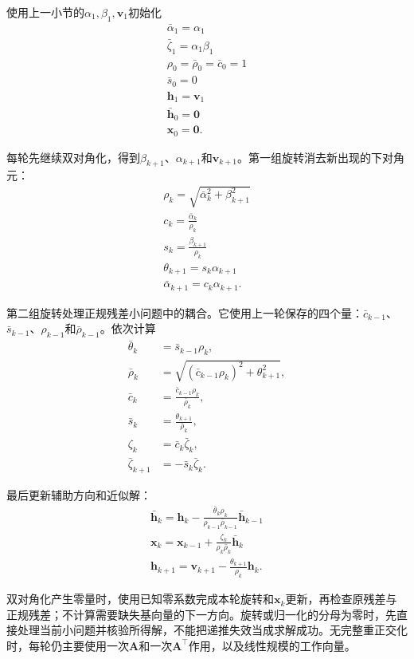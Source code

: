使用上一小节的$\alpha_1,\beta_1,\bm v_1$初始化
\[
 \begin{gathered}
\bar\alpha_1=\alpha_1\\
\bar\zeta_1=\alpha_1\beta_1\\
\rho_0=\bar\rho_0=\bar c_0=1\\
\bar s_0=0\\
\bm h_1=\bm v_1\\
\bar{\bm h}_0=\bm0\\
\bm x_0=\bm0.
 \end{gathered}
\]

每轮先继续双对角化，得到$\beta_{k+1}$、$\alpha_{k+1}$和$\bm v_{k+1}$。第一组旋转消去新出现的下对角元：
\[
 \begin{gathered}
\rho_k=\sqrt{\bar\alpha_k^2+\beta_{k+1}^2}\\
c_k=\frac{\bar\alpha_k}{\rho_k}\\
s_k=\frac{\beta_{k+1}}{\rho_k}\\
\theta_{k+1}=s_k\alpha_{k+1}\\
\bar\alpha_{k+1}=c_k\alpha_{k+1}.
 \end{gathered}
\]

第二组旋转处理正规残差小问题中的耦合。它使用上一轮保存的四个量：$\bar c_{k-1}$、$\bar s_{k-1}$、$\rho_{k-1}$和$\bar\rho_{k-1}$。依次计算
\begin{align*}
 \bar\theta_k&=\bar s_{k-1}\rho_k,\\
 \bar\rho_k&=\sqrt{(\bar c_{k-1}\rho_k)^2+\theta_{k+1}^2},\\
 \bar c_k&=\frac{\bar c_{k-1}\rho_k}{\bar\rho_k},\\
 \bar s_k&=\frac{\theta_{k+1}}{\bar\rho_k},\\
 \zeta_k&=\bar c_k\bar\zeta_k,\\
 \bar\zeta_{k+1}&=-\bar s_k\bar\zeta_k.
\end{align*}

最后更新辅助方向和近似解：
\[
 \begin{gathered}
\bar{\bm h}_k=\bm h_k-\frac{\bar\theta_k\rho_k}{\rho_{k-1}\bar\rho_{k-1}}\bar{\bm h}_{k-1}\\
\bm x_k=\bm x_{k-1}+\frac{\zeta_k}{\rho_k\bar\rho_k}\bar{\bm h}_k\\
\bm h_{k+1}=\bm v_{k+1}-\frac{\theta_{k+1}}{\rho_k}\bm h_k.
 \end{gathered}
\]

双对角化产生零量时，使用已知零系数完成本轮旋转和$\bm x_k$更新，再检查原残差与正规残差；不计算需要缺失基向量的下一方向。旋转或归一化的分母为零时，先直接处理当前小问题并核验所得解，不能把递推失效当成求解成功。无完整重正交化时，每轮仍主要使用一次$\bm A$和一次$\bm A^\top$作用，以及线性规模的工作向量。

